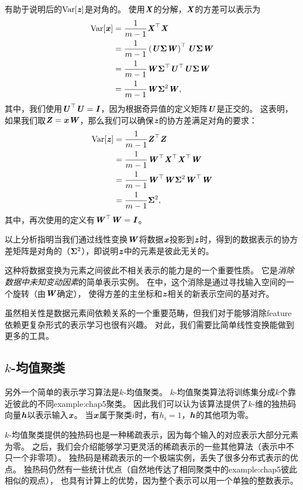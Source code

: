 
有助于说明后的$\text{Var}[\Vz]$是对角的。
使用$\MX$的分解，$\MX$的方差可以表示为
\begin{align}
    \text{Var}[\Vx] &= \frac{1}{m-1} \MX^\Tsp\MX \\
    &= \frac{1}{m-1} \left( \MU\VSigma \MW \right)^\Tsp \MU\VSigma \MW \\
    &= \frac{1}{m-1} \MW \VSigma^\Tsp \MU^\Tsp \MU\VSigma \MW \\
    &= \frac{1}{m-1} \MW \VSigma^2 \MW ,
\end{align}
其中，我们使用$\MU^\Tsp\MU = \MI$，因为根据奇异值的定义矩阵$\MU$是正交的。
这表明，如果我们取$\MZ=\Vx\MW$，那么我们可以确保$\Vz$的协方差满足对角的要求：
\begin{align}
    \text{Var}[\Vz] &= \frac{1}{m-1} \MZ^\Tsp\MZ \\
    &= \frac{1}{m-1} \MW^\Tsp \MX^\Tsp \MX^\Tsp \MW \\
    &= \frac{1}{m-1} \MW^\Tsp\MW \VSigma^2 \MW^\Tsp\MW \\
    &= \frac{1}{m-1} \VSigma^2 ,
\end{align}
其中，再次使用的定义有$\MW^\Tsp\MW = \MI$。

以上分析指明当我们通过线性变换$\MW$将数据$\Vx$投影到$\Vz$时，得到的数据表示的协方差矩阵是对角的（$\VSigma^2$），即说明$\Vz$中的元素是彼此无关的。

这种将数据变换为元素之间彼此不相关表示的能力是的一个重要性质。
它是\emph{消除数据中未知变动因素}的简单表示实例。
在中，这个消除是通过寻找输入空间的一个旋转（由$\MW$确定），
使得方差的主坐标和$\Vz$相关的新表示空间的基对齐。


虽然相关性是数据元素间依赖关系的一个重要范畴，但我们对于能够消除\gls{feature}依赖更复杂形式的表示学习也很有兴趣。
对此，我们需要比简单线性变换能做到更多的工具。

\subsection{$k$-均值聚类}
\label{sec:k_means_clustering}
另外一个简单的表示学习算法是$k$-均值聚类。
$k$-均值聚类算法将训练集分成$k$个靠近彼此的不同\gls{example:chap5}聚类。
因此我们可以认为该算法提供了$k$-维的独热码向量$\Vh$以表示输入$\Vx$。
当$\Vx$属于聚类$i$时，有$h_i=1$，$\Vh$的其他项为零。

$k$-均值聚类提供的独热码也是一种稀疏表示，因为每个输入的对应表示大部分元素为零。
之后，我们会介绍能够学习更灵活的稀疏表示的一些其他算法（表示中不只一个非零项）。
独热码是稀疏表示的一个极端实例，丢失了很多分布式表示的优点。
独热码仍然有一些统计优点（自然地传达了相同聚类中的\gls{example:chap5}彼此相似的观点），
也具有计算上的优势，因为整个表示可以用一个单独的整数表示。

